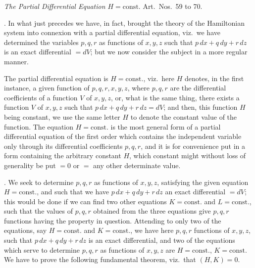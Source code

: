 \documentclass[11pt,a4paper]{article}
\begin{document}
\newpage


\begin{center}
\emph{The Partial Differential Equation $H = \text{const.}$} Art.\ Nos.\ 59 to 70.
\end{center}

\medskip

. In what just precedes we have, in fact, brought the theory of the Hamiltonian system into connexion with a partial differential equation, viz.\ we have determined the variables $p, q, r$ as functions of $x, y, z$ such that $p\,dx + q\,dy + r\,dz$ is an exact differential $= dV$; but we now consider the subject in a more regular manner.

The partial differential equation is $H = \text{const.}$, viz.\ here $H$ denotes, in the first instance, a given function of $p, q, r, x, y, z$, where $p, q, r$ are the differential coefficients of a function $V$ of $x, y, z$, or, what is the same thing, there exists a function $V$ of $x, y, z$ such that $p\,dx + q\,dy + r\,dz = dV$; and then, this function $H$ being constant, we use the same letter $H$ to denote the constant value of the function. The equation $H = \text{const.}$ is the most general form of a partial differential equation of the first order which contains the independent variable only through its differential coefficients $p, q, r$, and it is for convenience put in a form containing the arbitrary constant $H$, which constant might without loss of generality be put $= 0$ or $=$ any other determinate value.

\medskip

. We seek to determine $p, q, r$ as functions of $x, y, z$, satisfying the given equation $H = \text{const.}$, and such that we have $p\,dx + q\,dy + r\,dz$ an exact differential $= dV$; this would be done if we can find two other equations $K = \text{const.}$ and $L = \text{const.}$, such that the values of $p, q, r$ obtained from the three equations give $p, q, r$ functions having the property in question. Attending to only two of the equations, say $H = \text{const.}$ and $K = \text{const.}$, we have here $p, q, r$ functions of $x, y, z$, such that $p\,dx + q\,dy + r\,dz$ is an exact differential, and two of the equations which serve to determine $p, q, r$ as functions of $x, y, z$ are $H = \text{const.}$, $K = \text{const.}$ We have to prove the following fundamental theorem, viz.\ that $(H, K) = 0$.
\end{document}
